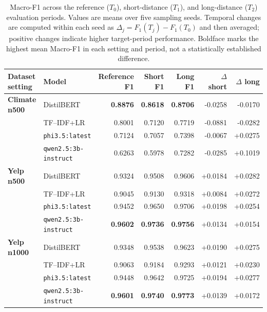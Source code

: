 \begin{table}[t]
\centering
\small
\caption{Macro-F1 across the reference ($T_0$), short-distance ($T_1$), and long-distance ($T_2$) evaluation periods. Values are means over five sampling seeds. Temporal changes are computed within each seed as $\Delta_j=F_1(T_j)-F_1(T_0)$ and then averaged; positive changes indicate higher target-period performance. Boldface marks the highest mean Macro-F1 in each setting and period, not a statistically established difference.}
\label{tab:temporal-robustness}
\begin{tabular}{llrrrrr}
\toprule
\textbf{Dataset setting} & \textbf{Model} & \textbf{Reference F1} & \textbf{Short F1} & \textbf{Long F1} & $\Delta$ \textbf{short} & $\Delta$ \textbf{long} \\
\midrule
\textbf{Climate n500} & DistilBERT & \textbf{0.8876} & \textbf{0.8618} & \textbf{0.8706} & -0.0258 & -0.0170 \\
 & TF--IDF+LR & 0.8001 & 0.7120 & 0.7719 & -0.0881 & -0.0282 \\
 & \texttt{phi3.5:latest} & 0.7124 & 0.7057 & 0.7398 & -0.0067 & +0.0275 \\
 & \texttt{qwen2.5:3b-instruct} & 0.6263 & 0.5978 & 0.7282 & -0.0285 & +0.1019 \\
\midrule
\textbf{Yelp n500} & DistilBERT & 0.9324 & 0.9508 & 0.9606 & +0.0184 & +0.0282 \\
 & TF--IDF+LR & 0.9045 & 0.9130 & 0.9318 & +0.0084 & +0.0272 \\
 & \texttt{phi3.5:latest} & 0.9452 & 0.9650 & 0.9706 & +0.0198 & +0.0254 \\
 & \texttt{qwen2.5:3b-instruct} & \textbf{0.9602} & \textbf{0.9736} & \textbf{0.9756} & +0.0134 & +0.0154 \\
\midrule
\textbf{Yelp n1000} & DistilBERT & 0.9348 & 0.9538 & 0.9623 & +0.0190 & +0.0275 \\
 & TF--IDF+LR & 0.9063 & 0.9184 & 0.9293 & +0.0121 & +0.0230 \\
 & \texttt{phi3.5:latest} & 0.9448 & 0.9642 & 0.9725 & +0.0194 & +0.0277 \\
 & \texttt{qwen2.5:3b-instruct} & \textbf{0.9601} & \textbf{0.9740} & \textbf{0.9773} & +0.0139 & +0.0172 \\
\bottomrule
\end{tabular}
\end{table}
